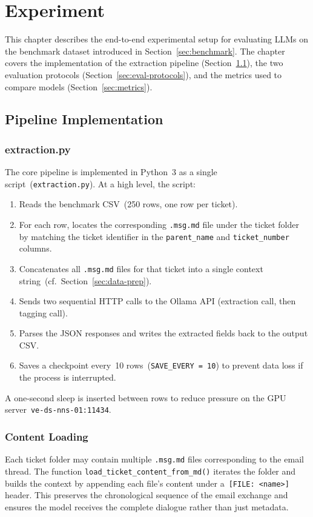 \chapter{Experiment}
%
\label{chap:Experiment}
%
This chapter describes the end-to-end experimental setup for evaluating LLMs
on the benchmark dataset introduced in Section~\ref{sec:benchmark}.  The
chapter covers the implementation of the extraction pipeline
(Section~\ref{sec:pipeline-impl}), the two evaluation protocols
(Section~\ref{sec:eval-protocols}), and the metrics used to compare models
(Section~\ref{sec:metrics}).

\section{Pipeline Implementation}
\label{sec:pipeline-impl}
%
\subsection{extraction.py}
%
The core pipeline is implemented in Python~3 as a single script~(\texttt{extraction.py}).
At a high level, the script:

\begin{enumerate}
    \item Reads the benchmark CSV~(250 rows, one row per ticket).
    \item For each row, locates the corresponding \texttt{.msg.md} file under
          the ticket folder by matching the ticket identifier in the
          \texttt{parent\_name} and \texttt{ticket\_number} columns.
    \item Concatenates all \texttt{.msg.md} files for that ticket into a
          single context string~(cf.\ Section~\ref{sec:data-prep}).
    \item Sends two sequential HTTP calls to the Ollama API
          (extraction call, then tagging call).
    \item Parses the JSON responses and writes the extracted fields back to the
          output CSV.
    \item Saves a checkpoint every~10 rows~(\texttt{SAVE\_EVERY~=~10}) to
          prevent data loss if the process is interrupted.
\end{enumerate}

A one-second sleep is inserted between rows to reduce pressure on the GPU
server~\texttt{ve-ds-nns-01:11434}.

\subsection{Content Loading}
%
Each ticket folder may contain multiple \texttt{.msg.md} files corresponding
to the email thread.  The function \texttt{load\_ticket\_content\_from\_md()}
iterates the folder and builds the context by appending each file's content
under a~\verb|[FILE: <name>]| header.  This preserves the chronological
sequence of the email exchange and ensures the model receives the complete
dialogue rather than just metadata.

